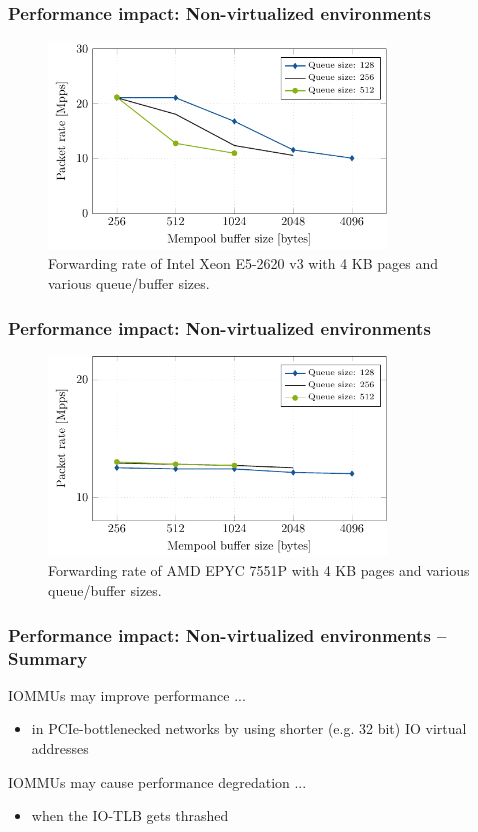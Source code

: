\begin{frame}
    \frametitle{Performance impact: Non-virtualized environments}

    \begin{figure}
        \centering
        \includegraphics[width=0.8\textwidth,clip]{figures/iotlb-24.pdf}
        \caption{Forwarding rate of Intel Xeon E5-2620 v3 with 4 KB pages and
        various queue/buffer sizes.}
    \end{figure}
\end{frame}

\begin{frame}
    \frametitle{Performance impact: Non-virtualized environments}

    \begin{figure}
        \centering
        \includegraphics[width=0.8\textwidth,clip]{figures/iotlb-20.pdf}
        \caption{Forwarding rate of AMD EPYC 7551P with 4 KB pages and various
        queue/buffer sizes.}
    \end{figure}
\end{frame}

\begin{frame}
    \frametitle{Performance impact: Non-virtualized environments – Summary}

    IOMMUs may improve performance ...
    \begin{itemize}
        \item in PCIe-bottlenecked networks by using shorter (e.g. 32 bit) IO
            virtual addresses
    \end{itemize}

    \vspace{1em}
    IOMMUs may cause performance degredation ...
    \begin{itemize}
        \item when the IO-TLB gets thrashed
    \end{itemize}
\end{frame}

